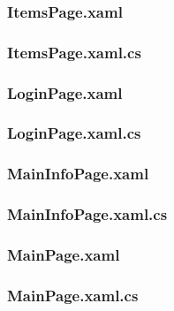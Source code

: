 \documentclass{../includes/TechDoc}
\begin{document}
    \subsubsection{ItemsPage.xaml}
    

    \subsubsection{ItemsPage.xaml.cs}
    

    \subsubsection{LoginPage.xaml}
    

    \subsubsection{LoginPage.xaml.cs}
    

    \subsubsection{MainInfoPage.xaml}
    

    \subsubsection{MainInfoPage.xaml.cs}
    

    \subsubsection{MainPage.xaml}
    

    \subsubsection{MainPage.xaml.cs}
    
\end{document}
